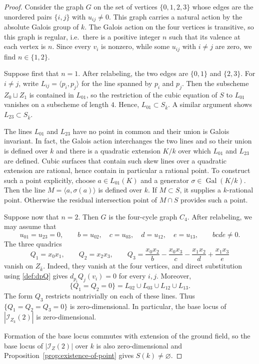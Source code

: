 \documentclass[a4paper,11pt]{amsart}
\numberwithin{equation}{section}
\theoremstyle{definition}
\theoremstyle{remark}
\newcommand{\Gal}{\operatorname{Gal}}
\begin{document}
\begin{proof}
Consider the graph $G$ on the set of vertices $\{0,1,2,3\}$ whose edges are the unordered pairs $\{i,j\}$ with $u_{ij}\ne 0$. 
This graph carries a natural action by the absolute Galois group of $k$. 
The Galois action on the four vertices is transitive, so this graph is regular, i.e.~there is a positive integer $n$ such that its valence at each vertex is $n$. 
Since every $v_i$ is nonzero, while some $u_{ij}$ with $i\neq j$ are zero, we find $n\in \{ 1,2\}$. 

Suppose first that $n=1$. 
After relabeling, the two edges are $\{0,1\}$ and $\{2,3\}$. 
For $i\neq j$, write $L_{ij}=\langle p_i,p_j\rangle$ for the line spanned by $p_i$ and $p_j$. 
Then the subscheme $Z_0\sqcup Z_1$ is contained in $L_{01}$, so the restriction of the cubic equation of $S$ to $L_{01}$ vanishes on a subscheme of length $4$.
Hence, $L_{01}\subset S_{\bar k}$. 
A similar argument shows $L_{23}\subset S_{\bar k}$.

The lines $L_{01}$ and $L_{23}$ have no point in common and their union is Galois invariant. 
In fact, the Galois action interchanges the two lines and so their union is defined over $k$ and there is a quadratic extension $K/k$ over which $L_{01}$ and $L_{23}$ are defined.
Cubic surfaces that contain such skew lines over a quadratic extension are rational, hence contain in particular a rational point.
To construct such a point explicitly, choose $a\in L_{01}(K)$ and a generator $\sigma\in \Gal(K/k)$. 
Then the line $ M=\langle a,\sigma(a)\rangle$ is defined over $k$. 
If $M\subset S$, it supplies a $k$-rational point. 
Otherwise the residual intersection point of $M\cap S$ provides such a point. 

Suppose now that $n=2$. 
Then $G$ is the four-cycle graph $C_4$.
After relabeling, we may assume that
\[
  u_{01}=u_{23}=0,
  \qquad b=u_{02},\quad c=u_{03},\quad d=u_{12},\quad e=u_{13},
  \qquad bcde\ne0.
\]
The three quadrics
\[
  Q_1=x_0x_1,\qquad Q_2=x_2x_3,   \qquad   Q_3=\frac{x_0x_2}{b}-\frac{x_0x_3}{c}      -\frac{x_1x_2}{d}+\frac{x_1x_3}{e}
\]
vanish on $Z_{\bar k}$. 
Indeed, they vanish at the four vertices, and direct substitution using \eqref{def:dpQ} gives $d_{p_i}Q_j(v_i)=0$ for every $i,j$.
Moreover,
\[
  \{Q_1=Q_2=0\}=L_{02}\cup L_{03}\cup L_{12}\cup L_{13}.
\]
The form $Q_3$ restricts nontrivially on each of these lines. 
Thus $\{Q_1=Q_2=Q_3=0\}$ is zero-dimensional. 
In particular, the base locus of $|\mathcal I_{Z_{\bar k}}(2)|$ is zero-dimensional.

Formation of the base locus commutes with extension of the ground field, so the base locus of $|\mathcal I_Z(2)|$ over $k$ is also zero-dimensional and Proposition~\ref{prop:existence-of-point} gives $S(k)\ne\varnothing$.
\end{proof}
\end{document}
